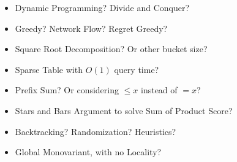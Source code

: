 \begin{itemize}
	\item Dynamic Programming? Divide and Conquer?
	\item Greedy? Network Flow? Regret Greedy?
	\item Square Root Decomposition? Or other bucket size?
	\item Sparse Table with $O(1)$ query time?
	\item Prefix Sum? Or considering $\le x$ instead of $= x$?
	\item Stars and Bars Argument to solve Sum of Product Score?
	\item Backtracking? Randomization? Heuristics?
	\item Global Monovariant, with no Locality?
\end{itemize}